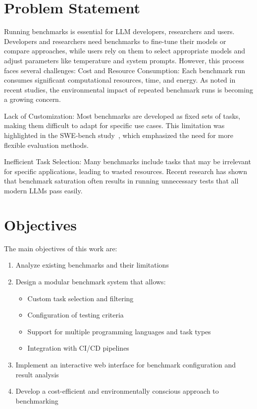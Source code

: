 \section{Problem Statement}

Running benchmarks is essential for LLM developers, researchers and users. Developers and researchers need benchmarks to fine-tune their models or compare approaches, while users rely on them to select appropriate models and adjust parameters like temperature and system prompts. However, this process faces several challenges:
Cost and Resource Consumption: Each benchmark run consumes significant computational resources, time, and energy. As noted in recent studies, the environmental impact of repeated benchmark runs is becoming a growing concern.

Lack of Customization: Most benchmarks are developed as fixed sets of tasks, making them difficult to adapt for specific use cases. This limitation was highlighted in the SWE-bench study~\cite{jimenez2024swebenchlanguagemodelsresolve}, which emphasized the need for more flexible evaluation methods.

Inefficient Task Selection: Many benchmarks include tasks that may be irrelevant for specific applications, leading to wasted resources. Recent research \cite{vendrow2025largelanguagemodelbenchmarks} has shown that benchmark saturation often results in running unnecessary tests that all modern LLMs pass easily.

\section{Objectives}

The main objectives of this work are:
\begin{enumerate}
    \item Analyze existing benchmarks and their limitations
    \item Design a modular benchmark system that allows:
    \begin{itemize}
        \item Custom task selection and filtering
        \item Configuration of testing criteria
        \item Support for multiple programming languages and task types
        \item Integration with CI/CD pipelines
    \end{itemize}
    \item Implement an interactive web interface for benchmark configuration and result analysis
    \item Develop a cost-efficient and environmentally conscious approach to benchmarking
\end{enumerate}

